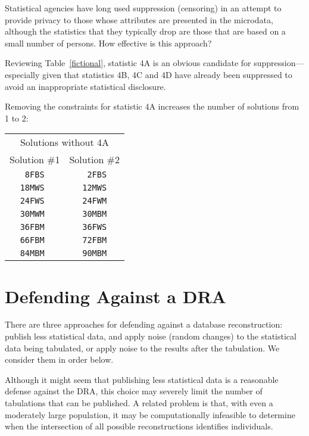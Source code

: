 \documentclass[runningheads]{llncs}
\begin{document}
Statistical agencies have long used suppression (censoring) in an
attempt to provide privacy to those whose attributes are presented in
the microdata, although the statistics that they typically drop are
those that are based on a small number of persons. How effective is
this approach?

Reviewing Table~\ref{fictional}, statistic 4A is an obvious candidate
for suppression---especially given that statistics 4B, 4C and 4D have
already been suppressed to avoid an inappropriate statistical
disclosure.

Removing the constraints for statistic 4A increases the number of
solutions from 1 to 2:

\begin{center}
\begin{tabular}{c|c}
\multicolumn{2}{c}{Solutions without 4A}\\
  Solution \#1 & Solution \#2 \\
\hline
 \texttt{ 8FBS } &  \texttt{ 2FBS} \\
 \texttt{18MWS } &  \texttt{12MWS} \\
 \texttt{24FWS } &  \texttt{24FWM} \\
 \texttt{30MWM } &  \texttt{30MBM} \\
 \texttt{36FBM } &  \texttt{36FWS} \\
 \texttt{66FBM } &  \texttt{72FBM} \\
 \texttt{84MBM } &  \texttt{90MBM} \\
  \end{tabular}
\end{center}


\section{Defending Against a DRA}\label{solution}
There are three approaches for defending against a database reconstruction: publish less
statistical data, and apply noise (random changes) to the
statistical data being tabulated, or apply noise to the results after
the tabulation. We consider them in order below.

Although it might seem that publishing less statistical data is a
reasonable defense against the DRA, this choice may severely limit the number
of tabulations that can be published. A
related problem is that, with even a moderately large population, it may be computationally infeasible to
determine when the intersection of all possible reconstructions
identifies individuals.
\end{document}
